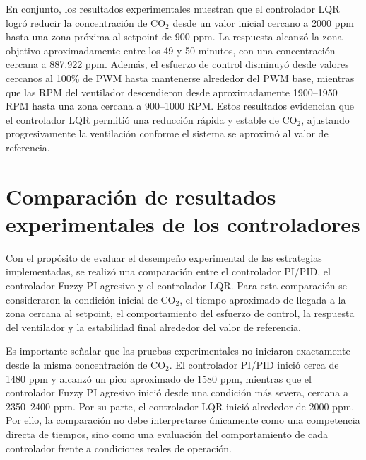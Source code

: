 En conjunto, los resultados experimentales muestran que el controlador LQR logró reducir la concentración de CO\(_2\) desde un valor inicial cercano a 2000 ppm hasta una zona próxima al setpoint de 900 ppm. La respuesta alcanzó la zona objetivo aproximadamente entre los 49 y 50 minutos, con una concentración cercana a 887.922 ppm. Además, el esfuerzo de control disminuyó desde valores cercanos al 100\% de PWM hasta mantenerse alrededor del PWM base, mientras que las RPM del ventilador descendieron desde aproximadamente 1900--1950 RPM hasta una zona cercana a 900--1000 RPM. Estos resultados evidencian que el controlador LQR permitió una reducción rápida y estable de CO\(_2\), ajustando progresivamente la ventilación conforme el sistema se aproximó al valor de referencia.


\section{Comparación de resultados experimentales de los controladores}

Con el propósito de evaluar el desempeño experimental de las estrategias implementadas, se realizó una comparación entre el controlador PI/PID, el controlador Fuzzy PI agresivo y el controlador LQR. Para esta comparación se consideraron la condición inicial de CO\(_2\), el tiempo aproximado de llegada a la zona cercana al setpoint, el comportamiento del esfuerzo de control, la respuesta del ventilador y la estabilidad final alrededor del valor de referencia.

Es importante señalar que las pruebas experimentales no iniciaron exactamente desde la misma concentración de CO\(_2\). El controlador PI/PID inició cerca de 1480 ppm y alcanzó un pico aproximado de 1580 ppm, mientras que el controlador Fuzzy PI agresivo inició desde una condición más severa, cercana a 2350--2400 ppm. Por su parte, el controlador LQR inició alrededor de 2000 ppm. Por ello, la comparación no debe interpretarse únicamente como una competencia directa de tiempos, sino como una evaluación del comportamiento de cada controlador frente a condiciones reales de operación.

